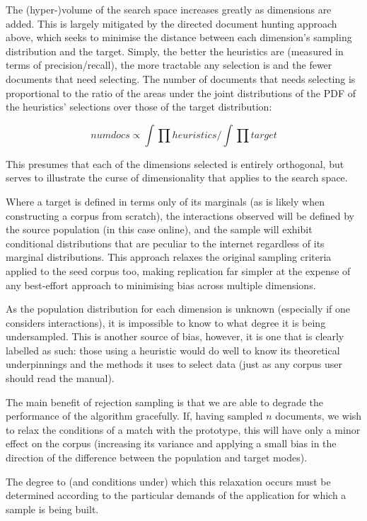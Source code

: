 The (hyper-)volume of the search space increases greatly as dimensions are added.  This is largely mitigated by the directed document hunting approach above, which seeks to minimise the distance between each dimension's sampling distribution and the target.  Simply, the better the heuristics are (measured in terms of precision/recall), the more tractable any selection is and the fewer documents that need selecting.  The number of documents that needs selecting is proportional to the ratio of the areas under the joint distributions of the PDF of the heuristics' selections over those of the target distribution:

$$
numdocs \propto \int{\prod{heuristics}} / \int{\prod{target}}
$$

This presumes that each of the dimensions selected is entirely orthogonal, but serves to illustrate the curse of dimensionality that applies to the search space.

Where a target is defined in terms only of its marginals (as is likely when constructing a corpus from scratch), the interactions observed will be defined by the source population (in this case online), and the sample will exhibit conditional distributions that are peculiar to the internet regardless of its marginal distributions.  This approach relaxes the original sampling criteria applied to the seed corpus too, making replication far simpler at the expense of any best-effort approach to minimising bias across multiple dimensions.

As the population distribution for each dimension is unknown (especially if one considers interactions), it is impossible to know to what degree it is being undersampled.  This is another source of bias, however, it is one that is clearly labelled as such: those using a heuristic would do well to know its theoretical underpinnings and the methods it uses to select data (just as any corpus user should read the manual).

The main benefit of rejection sampling is that we are able to degrade the performance of the algorithm gracefully.  If, having sampled $n$ documents, we wish to relax the conditions of a match with the prototype, this will have only a minor effect on the corpus (increasing its variance and applying a small bias in the direction of the difference between the population and target modes).  

The degree to (and conditions under) which this relaxation occurs must be determined according to the particular demands of the application for which a sample is being built.



